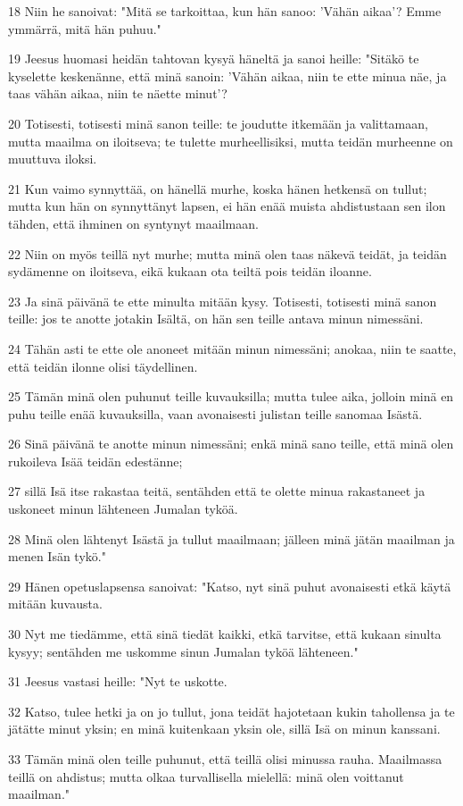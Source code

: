 \par 18 Niin he sanoivat: "Mitä se tarkoittaa, kun hän sanoo: 'Vähän aikaa'? Emme ymmärrä, mitä hän puhuu."
\par 19 Jeesus huomasi heidän tahtovan kysyä häneltä ja sanoi heille: "Sitäkö te kyselette keskenänne, että minä sanoin: 'Vähän aikaa, niin te ette minua näe, ja taas vähän aikaa, niin te näette minut'?
\par 20 Totisesti, totisesti minä sanon teille: te joudutte itkemään ja valittamaan, mutta maailma on iloitseva; te tulette murheellisiksi, mutta teidän murheenne on muuttuva iloksi.
\par 21 Kun vaimo synnyttää, on hänellä murhe, koska hänen hetkensä on tullut; mutta kun hän on synnyttänyt lapsen, ei hän enää muista ahdistustaan sen ilon tähden, että ihminen on syntynyt maailmaan.
\par 22 Niin on myös teillä nyt murhe; mutta minä olen taas näkevä teidät, ja teidän sydämenne on iloitseva, eikä kukaan ota teiltä pois teidän iloanne.
\par 23 Ja sinä päivänä te ette minulta mitään kysy. Totisesti, totisesti minä sanon teille: jos te anotte jotakin Isältä, on hän sen teille antava minun nimessäni.
\par 24 Tähän asti te ette ole anoneet mitään minun nimessäni; anokaa, niin te saatte, että teidän ilonne olisi täydellinen.
\par 25 Tämän minä olen puhunut teille kuvauksilla; mutta tulee aika, jolloin minä en puhu teille enää kuvauksilla, vaan avonaisesti julistan teille sanomaa Isästä.
\par 26 Sinä päivänä te anotte minun nimessäni; enkä minä sano teille, että minä olen rukoileva Isää teidän edestänne;
\par 27 sillä Isä itse rakastaa teitä, sentähden että te olette minua rakastaneet ja uskoneet minun lähteneen Jumalan tyköä.
\par 28 Minä olen lähtenyt Isästä ja tullut maailmaan; jälleen minä jätän maailman ja menen Isän tykö."
\par 29 Hänen opetuslapsensa sanoivat: "Katso, nyt sinä puhut avonaisesti etkä käytä mitään kuvausta.
\par 30 Nyt me tiedämme, että sinä tiedät kaikki, etkä tarvitse, että kukaan sinulta kysyy; sentähden me uskomme sinun Jumalan tyköä lähteneen."
\par 31 Jeesus vastasi heille: "Nyt te uskotte.
\par 32 Katso, tulee hetki ja on jo tullut, jona teidät hajotetaan kukin tahollensa ja te jätätte minut yksin; en minä kuitenkaan yksin ole, sillä Isä on minun kanssani.
\par 33 Tämän minä olen teille puhunut, että teillä olisi minussa rauha. Maailmassa teillä on ahdistus; mutta olkaa turvallisella mielellä: minä olen voittanut maailman."

